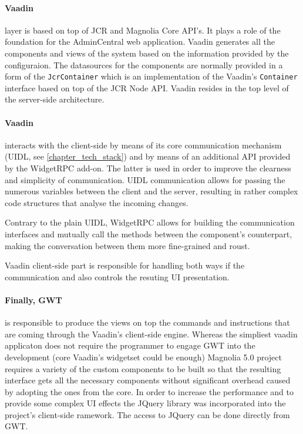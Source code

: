 \paragraph{Vaadin} layer is based on top of JCR and Magnolia Core API's. It
plays a role of the foundation for the AdminCentral web application. Vaadin
generates all the components and views of the system based on the information
provided by the configuraion. The datasources for the components are normally
provided in a form of the \texttt{JcrContainer} which is an implementation of
the Vaadin's \texttt{Container} interface based on top of the JCR Node API.
Vaadin resides in the top level of the server-side architecture. 

\paragraph{Vaadin} interacts with the client-side by means of its core
communication mechanism (UIDL, see \ref{chapter_tech_stack}) and by means of an
additional API provided by the WidgetRPC add-on. The latter is used in order to
improve the clearness and simplicity of communication. UIDL
communication allows for passing the numerous variables between the client and
the server, resulting in rather complex code structures that analyse the
incoming changes.

Contrary to the plain UIDL, WidgetRPC allows for building the communication
interfaces and mutually call the methods between the component's counterpart,
making the conversation between them more fine-grained and roust.

Vaadin client-side part is responsible for handling both ways if the
communication and also controls the resuting UI presentation.

\paragraph{Finally, GWT} is responsible to produce the views on top the commands
and instructions that are coming through the Vaadin's client-side engine.
Whereas the simpliest vaadin applicaton does not require the programmer to engage
GWT into the development (core Vaadin's widgetset could be enough) Magnolia 5.0
project requires a variety of the custom components to be built so that the
resulting interface gets all the necessary components without significant
overhead caused by adopting the ones from the core. In order to increase the
performance and to provide some complex UI effects the JQuery library was
incorporated into the project's client-side ramework. The access to JQuery can
be done directly from GWT.
